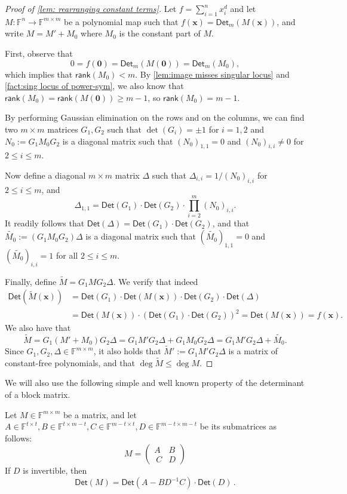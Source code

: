 \documentclass[10pt,a4paper]{article}
\newcommand{\F}{\mathbb{F}}
\newcommand{\vx}{\mathbf{x}}
\newcommand{\vzero}{\mathbf{0}}
\newcommand{\Det}{\mathsf{Det}}
\newcommand{\rank}{\mathsf{rank}}
\begin{document}
\begin{proof}[Proof of \autoref{lem: rearranging constant terms}]
Let $f = \sum_{i=1}^n x_i^d$ and let $M : \F^n \to \F^{m \times m}$ be a polynomial map such that $f(\vx)  = \Det_m(M(\vx))$, and write $M=M'+M_0$ where $M_0$ is the constant part of $M$.

First, observe that
\[
0 = f(\vzero) = \Det_m(M(\vzero)) = \Det_m(M_0),
\]
which implies that $\rank(M_0) < m$. By \autoref{lem:image misses singular locus} and \autoref{fact:sing locus of power-sym}, we also know that $\rank(M_0) = \rank(M(\vzero)) \ge m-1$, so $\rank(M_0) = m-1$.

By performing Gaussian elimination on the rows and on the columns, we can find two $m \times m$ matrices $G_1, G_2$ such that $\det(G_i) = \pm 1$ for $i=1,2$ and $N_0 := G_1 M_0 G_2$ is a diagonal matrix such that $(N_0)_{1,1} = 0$ and $(N_0)_{i,i} \neq 0$ for $2 \le i \le m$.

Now define a diagonal $m\times m$ matrix $\Delta$ such that $\Delta_{i,i} = 1/(N_0)_{i,i}$ for $2 \le i \le m$, and
\[
\Delta_{1,1} = \Det(G_1) \cdot \Det(G_2) \cdot \prod_{i=2}^m (N_0)_{i,i}.
\]
It readily follows that $\Det(\Delta) = \Det(G_1) \cdot \Det(G_2)$, and that $\tilde{M_0} := (G_1 M_0 G_2) \Delta$ is a diagonal matrix such that $(\tilde{M_0})_{1,1} = 0$ and $(\tilde{M_0})_{i,i} = 1$ for all $2 \le i \le m$.

Finally, define $\tilde{M} = G_1 M G_2 \Delta$. We verify that indeed
\begin{align*}
\Det(\tilde{M}(\vx)) &= \Det(G_1) \cdot \Det(M(\vx)) \cdot \Det(G_2) \cdot \Det(\Delta) \\
&= \Det(M(\vx)) \cdot (\Det(G_1) \cdot \Det(G_2))^2 = \Det(M(\vx)) = f(\vx).
\end{align*}
We also have that
\[
\tilde{M} = G_1 (M' + M_0) G_2 \Delta = G_1 M' G_2 \Delta + G_1 M_0 G_2 \Delta = G_1 M' G_2 \Delta + \tilde{M_0}.
\]
Since $G_1, G_2, \Delta \in \F^{m \times m}$, it also holds that $\tilde{M}' := G_1 M' G_2 \Delta$ is a matrix of constant-free polynomials, and that  $ \deg \tilde{M} \le  \deg M$. 
\end{proof}

We will also use the following simple and well known property of the determinant of a block matrix.

\begin{lemma}\label{lem:reducing size}
Let $M \in \F^{m \times m}$ be a matrix, and let $A \in \F^{t\times t}, B \in \F^{t\times m-t}, C \in \F^{m-t\times t}, D \in \F^{m-t\times m-t}$ be its submatrices as follows:
\[ M = \begin{pmatrix}
   A & B\\\
C & D
 \end{pmatrix}
 \]
 If $D$ is invertible, then 
 \[
 \Det (M)  = \Det (A - BD^{-1}C ) \cdot \Det (D) \, .
 \]
\end{lemma}
\end{document}
